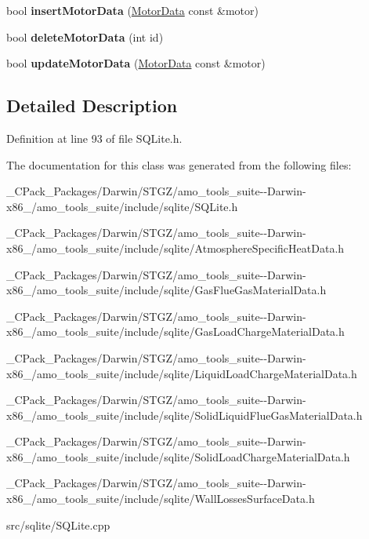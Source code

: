 \begin{DoxyCompactItemize}
\item 
\mbox{\label{class_s_q_lite_a38eb0f1501e0918c267a9ab3a0953a54}} 
bool {\bfseries insert\+Motor\+Data} (\hyperlink{class_motor_data}{Motor\+Data} const \&motor)
\item 
\mbox{\label{class_s_q_lite_ab1f59cd24e3931970bc39079b0a5e612}} 
bool {\bfseries delete\+Motor\+Data} (int id)
\item 
\mbox{\label{class_s_q_lite_a7909128eed1b0612ecdf7c50edf1426a}} 
bool {\bfseries update\+Motor\+Data} (\hyperlink{class_motor_data}{Motor\+Data} const \&motor)
\end{DoxyCompactItemize}


\subsection{Detailed Description}


Definition at line 93 of file S\+Q\+Lite.\+h.



The documentation for this class was generated from the following files\+:\begin{DoxyCompactItemize}
\item 
\+\_\+\+C\+Pack\+\_\+\+Packages/\+Darwin/\+S\+T\+G\+Z/amo\+\_\+tools\+\_\+suite-\/-\/\+Darwin-\/x86\+\_/amo\+\_\+tools\+\_\+suite/include/sqlite/S\+Q\+Lite.\+h\item 
\+\_\+\+C\+Pack\+\_\+\+Packages/\+Darwin/\+S\+T\+G\+Z/amo\+\_\+tools\+\_\+suite-\/-\/\+Darwin-\/x86\+\_/amo\+\_\+tools\+\_\+suite/include/sqlite/Atmosphere\+Specific\+Heat\+Data.\+h\item 
\+\_\+\+C\+Pack\+\_\+\+Packages/\+Darwin/\+S\+T\+G\+Z/amo\+\_\+tools\+\_\+suite-\/-\/\+Darwin-\/x86\+\_/amo\+\_\+tools\+\_\+suite/include/sqlite/Gas\+Flue\+Gas\+Material\+Data.\+h\item 
\+\_\+\+C\+Pack\+\_\+\+Packages/\+Darwin/\+S\+T\+G\+Z/amo\+\_\+tools\+\_\+suite-\/-\/\+Darwin-\/x86\+\_/amo\+\_\+tools\+\_\+suite/include/sqlite/Gas\+Load\+Charge\+Material\+Data.\+h\item 
\+\_\+\+C\+Pack\+\_\+\+Packages/\+Darwin/\+S\+T\+G\+Z/amo\+\_\+tools\+\_\+suite-\/-\/\+Darwin-\/x86\+\_/amo\+\_\+tools\+\_\+suite/include/sqlite/Liquid\+Load\+Charge\+Material\+Data.\+h\item 
\+\_\+\+C\+Pack\+\_\+\+Packages/\+Darwin/\+S\+T\+G\+Z/amo\+\_\+tools\+\_\+suite-\/-\/\+Darwin-\/x86\+\_/amo\+\_\+tools\+\_\+suite/include/sqlite/Solid\+Liquid\+Flue\+Gas\+Material\+Data.\+h\item 
\+\_\+\+C\+Pack\+\_\+\+Packages/\+Darwin/\+S\+T\+G\+Z/amo\+\_\+tools\+\_\+suite-\/-\/\+Darwin-\/x86\+\_/amo\+\_\+tools\+\_\+suite/include/sqlite/Solid\+Load\+Charge\+Material\+Data.\+h\item 
\+\_\+\+C\+Pack\+\_\+\+Packages/\+Darwin/\+S\+T\+G\+Z/amo\+\_\+tools\+\_\+suite-\/-\/\+Darwin-\/x86\+\_/amo\+\_\+tools\+\_\+suite/include/sqlite/Wall\+Losses\+Surface\+Data.\+h\item 
src/sqlite/S\+Q\+Lite.\+cpp\end{DoxyCompactItemize}
